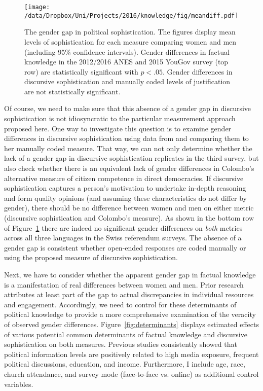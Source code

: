 \begin{figure}[h]\centering
	\texttt{[image: /data/Dropbox/Uni/Projects/2016/knowledge/fig/meandiff.pdf]}
	\caption[The gender gap in political sophistication]{The gender gap in political sophistication. The figures display mean levels of sophistication for each measure comparing women and men (including 95\% confidence intervals). Gender differences in factual knowledge in the 2012/2016 ANES and 2015 YouGov survey (top row) are statistically significant with $p<.05$. Gender differences in discursive sophistication and manually coded levels of justification \citep{colombo2016justifications} are not statistically significant.}\label{fig:meandiff}
\end{figure}

Of course, we need to make sure that this absence of a gender gap in discursive sophistication is not idiosyncratic to the particular measurement approach proposed here. One way to investigate this question is to examine gender differences in discursive sophistication using data from \citet{colombo2016justifications} and comparing them to her manually coded measure. That way, we can not only determine whether the lack of a gender gap in discursive sophistication replicates in the third survey, but also check whether there is an equivalent lack of gender differences in Colombo's alternative measure of citizen competence in direct democracies. If discursive sophistication captures a person's motivation to undertake in-depth reasoning and form quality opinions (and assuming these characteristics do not differ by gender), there should be no difference between women and men on either metric (discursive sophistication and Colombo's measure). As shown in the bottom row of Figure~\ref{fig:meandiff} there are indeed no significant gender differences on \textit{both} metrics across all three languages in the Swiss referendum surveys. The absence of a gender gap is consistent whether open-ended responses are coded manually or using the proposed measure of discursive sophistication.

Next, we have to consider whether the apparent gender gap in factual knowledge is a manifestation of real differences between women and men. Prior research attributes at least part of the gap to actual discrepancies in individual resources and engagement. Accordingly, we need to control for these determinants of political knowledge to provide a more comprehensive examination of the veracity of observed gender differences. Figure~\ref{fig:determinants} displays estimated effects of various potential common determinants of factual knowledge and discursive sophistication on both measures. Previous studies consistently showed that political information levels are positively related to high media exposure, frequent political discussions, education, and income. Furthermore, I include age, race, church attendance, and survey mode (face-to-face vs. online) as additional control variables.


